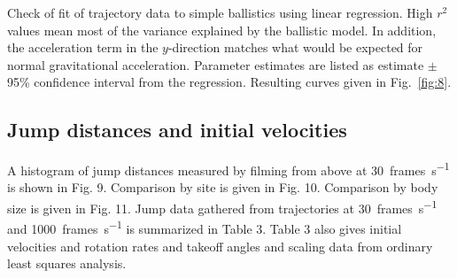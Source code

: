 \documentclass{article}
\newcommand{\Genus}[1]{\emph{#1}}
\newcommand{\Hyale}{\Genus{H.~pugettensis}}
\begin{document}
%



\begin{table}
\caption{ Check of fit of trajectory data to simple ballistics using linear regression.  High $r^2$ values mean most of the variance explained by the ballistic model.  In addition, the acceleration term in the $y$-direction matches what would be expected for normal gravitational acceleration.  Parameter estimates are listed as estimate $\pm$ 95\% confidence interval from the regression.  Resulting curves given in Fig.~\ref{fig:8}.}
\label{table:2}
\end{table}

\subsection*{Jump distances and initial velocities}
	A histogram of jump distances measured by filming from above at \SI{30}{frames\per\second} is shown in Fig. 9.  Comparison by site is given in Fig. 10.  Comparison by body size is given in Fig. 11.  Jump data gathered from trajectories at \SI{30}{frames\per\second} and \SI{1000}{frames\per\second} is summarized in Table 3.  Table 3 also gives initial velocities and rotation rates and takeoff angles and scaling data from ordinary least squares analysis. 
\end{document}
